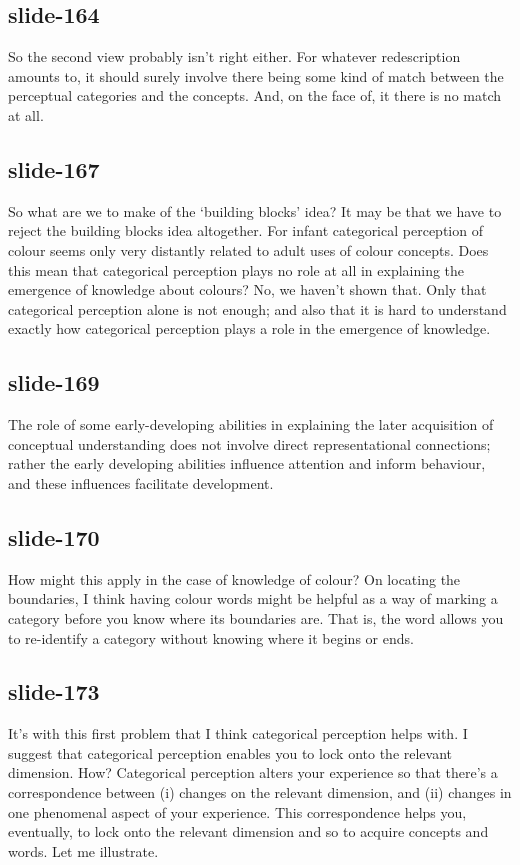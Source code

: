 \documentclass[12pt,\papersize]{extarticle}
\begin{document}
 
\subsection{slide-164}
So the second view probably isn't right either.
For whatever redescription amounts to, it should surely involve there being some kind of match between the perceptual categories and the concepts.
And, on the face of, it there is no match at all.
 
 
\subsection{slide-167}
So what are we to make of the ‘building blocks’ idea?
It may be that we have to reject the building blocks idea altogether.
For infant categorical perception of colour seems only very distantly related to adult uses of colour concepts.
Does this mean that categorical perception plays no role at all in explaining the emergence of knowledge about colours?
No, we haven't shown that. Only that categorical perception alone is not enough; and also that it is hard to understand exactly how categorical perception plays a role in the emergence of knowledge.
 
 
\subsection{slide-169}
The role of some early-developing abilities in explaining the later acquisition of conceptual understanding does not involve direct representational connections; rather the early developing abilities influence attention and inform behaviour, and these influences facilitate development.
 
 
\subsection{slide-170}
How might this apply in the case of knowledge of colour?
On locating the boundaries, I think having colour words might be helpful as a way of marking a category before you know where its boundaries are.
That is, the word allows you to re-identify a category without knowing where it begins or ends.
 
 
\subsection{slide-173}
It's with this first problem that I think categorical perception helps with.
I suggest that categorical perception enables you to lock onto the relevant dimension.
How?
Categorical perception alters your experience so that there's a correspondence between (i) changes on the relevant dimension, and (ii) changes in one phenomenal aspect of your experience.
This correspondence helps you, eventually, to lock onto the relevant dimension and so to acquire concepts and words.
Let me illustrate.
 
\end{document}
